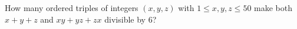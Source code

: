 How many ordered triples of integers $(x,y,z)$ with $1\le x,y,z\le50$ make both $x+y+z$ and $xy+yz+zx$ divisible by $6$?
